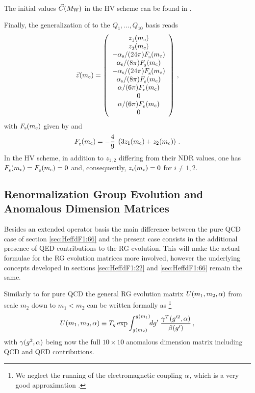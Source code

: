 The initial values $\vec{C}(M_{\rm W})$ in the HV scheme can be found in
\cite{burasetal:92d}.

Finally, the generalization of  to the $Q_1,\ldots,Q_{10}$
basis reads \cite{burasetal:92d}
\begin{equation}
\vec{z}^{\rm }(m_{\rm c}) =
\left( \begin{array}{c}
z_1^{\rm }(m_{\rm c}) \\ z_2^{\rm }(m_{\rm c}) \\
-\alpha_{\rm s}/(24\pi) F_{\rm s}^{\rm }(m_{\rm c}) \\ \alpha_{\rm s}/(8\pi) F_{\rm s}^{\rm }(m_{\rm c}) \\ 
-\alpha_{\rm s}/(24\pi) F_{\rm s}^{\rm }(m_{\rm c}) \\ \alpha_{\rm s}/(8\pi) F_{\rm s}^{\rm }(m_{\rm c}) \\ 
\alpha/(6\pi) F_{\rm e}^{\rm }(m_{\rm c}) \\  0  \\
\alpha/(6\pi) F_{\rm e}^{\rm }(m_{\rm c}) \\  0
\end{array} \right) \, ,
\label{eq:zmc:1010}
\end{equation}
with $F_{\rm s}(m_{\rm c})$ given by  and 
\begin{equation}
F_{\rm e}^{\rm }(m_{\rm c}) =
-\frac{4}{9} \; \left( 3 z_1(m_{\rm c}) + z_2(m_{\rm c}) \right) \, .
\label{eq:Femc}
\end{equation}
In the HV scheme, in addition to $z_{1,2}$ differing from their NDR values, 
one has $F_{\rm s}^{\rm }(m_{\rm c}) = F_{\rm e}^{\rm }(m_{\rm c})
= 0$ and, consequently, $z_i(m_{\rm c}) = 0$ for $i\not=1,2$.

\subsection{Renormalization Group Evolution and Anomalous Dimension Matrices}
            \label{sec:HeffdF1:1010:rge}
Besides an extended operator basis the main difference between the pure
QCD case of section \ref{sec:HeffdF1:66} and the present case consists in
the additional presence of QED contributions to the RG evolution.  This
will make the actual formulae for the RG evolution matrices more
involved, however the underlying concepts developed in
sections \ref{sec:HeffdF1:22} and \ref{sec:HeffdF1:66} remain the same.

Similarly to  for pure QCD the general RG evolution
matrix $U(m_1,m_2,\alpha)$ from scale $m_2$ down to $m_1 < m_2$ can be
written formally as \footnote{We neglect the running of the 
electromagnetic coupling $\alpha$, which is a very good approximation
\cite{buchallaetal:90}.}
\begin{equation}
U(m_1,m_2,\alpha) \equiv T_g \exp
\int_{g(m_2)}^{g(m_1)} \!\! dg' \; \frac{\gamma^T(g'^2,\alpha)}{\beta(g')} \, ,
\label{eq:Ugeneral}
\end{equation}
with $\gamma(g^2,\alpha)$ being now the full $10\times 10$ anomalous dimension
matrix including QCD and QED contributions.

